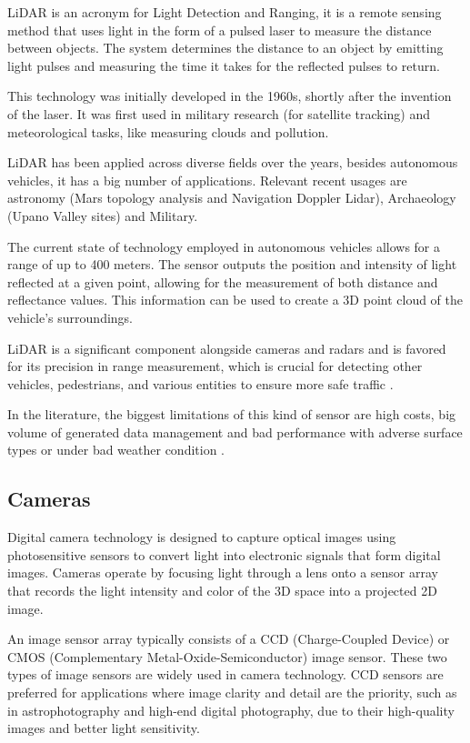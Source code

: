LiDAR is an acronym for Light Detection and Ranging, it is a remote sensing method that uses light in the form of a pulsed laser to measure the distance between objects. The system determines the distance to an object by emitting light pulses and measuring the time it takes for the reflected pulses to return. 

This technology was initially developed in the 1960s, shortly after the invention of the laser. It was first used in military research (for satellite tracking) and meteorological tasks, like measuring clouds and pollution.

LiDAR has been applied across diverse fields over the years, besides autonomous vehicles, it has a big number of applications. Relevant recent usages are astronomy (Mars topology analysis and Navigation Doppler Lidar), Archaeology (Upano Valley sites) and Military.

The current state of technology employed in autonomous vehicles allows for a range of up to 400 meters. The sensor outputs the position and intensity of light reflected at a given point, allowing for the measurement of both distance and reflectance values. This information can be used to create a 3D point cloud of the vehicle's surroundings.

LiDAR is a significant component alongside cameras and radars and is favored for its precision in range measurement, which is crucial for detecting other vehicles, pedestrians, and various entities to ensure more safe traffic \cite{li2020lidar}.

In the literature, the biggest limitations of this kind of sensor are high costs, big volume of generated data management and bad performance with adverse surface types or under bad weather condition \cite{s23062972}.

\subsection{Cameras}

Digital camera technology is designed to capture optical images using photosensitive sensors to convert light into electronic signals that form digital images. Cameras operate by focusing light through a lens onto a sensor array that records the light intensity and color of the 3D space into a projected 2D image.

An image sensor array typically consists of a CCD (Charge-Coupled Device) or CMOS (Complementary Metal-Oxide-Semiconductor) image sensor. These two types of image sensors are widely used in camera technology. CCD sensors are preferred for applications where image clarity and detail are the priority, such as in astrophotography and high-end digital photography, due to their high-quality images and better light sensitivity.


